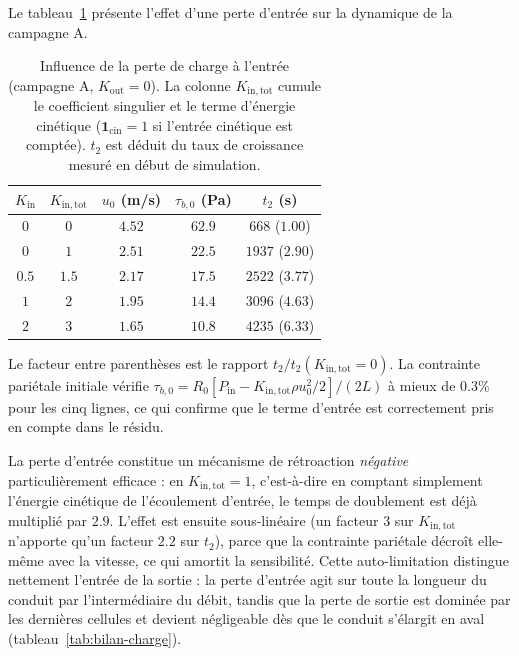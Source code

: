 \documentclass[11pt,a4paper]{report}
\newcommand{\kout}{K_{\mathrm{out}}}
\begin{document}
Le tableau~\ref{tab:kin} présente l'effet d'une perte d'entrée sur la dynamique de la campagne A.

\begin{table}[H]
\centering
\caption{Influence de la perte de charge à l'entrée (campagne A, \(\kout = 0\)). La colonne
\(K_{\mathrm{in,tot}}\) cumule le coefficient singulier et le terme d'énergie cinétique
(\(\mathbf{1}_{\mathrm{cin}} = 1\) si l'entrée cinétique est comptée). \(t_2\) est déduit du taux de
croissance mesuré en début de simulation.}
\label{tab:kin}
\small
\begin{tabular}{ccccc}
\toprule
\(K_{\mathrm{in}}\) & \(K_{\mathrm{in,tot}}\) & \(u_0\) (m/s) & \(\tau_{b,0}\) (Pa) & \(t_2\) (s) \\
\midrule
\(0\)   & \(0\)   & \(4.52\) & \(62.9\)  & \(668\) \quad (\(1.00\)) \\
\(0\)   & \(1\)   & \(2.51\) & \(22.5\)  & \(1937\) \quad (\(2.90\)) \\
\(0.5\) & \(1.5\) & \(2.17\) & \(17.5\)  & \(2522\) \quad (\(3.77\)) \\
\(1\)   & \(2\)   & \(1.95\) & \(14.4\)  & \(3096\) \quad (\(4.63\)) \\
\(2\)   & \(3\)   & \(1.65\) & \(10.8\)  & \(4235\) \quad (\(6.33\)) \\
\bottomrule
\end{tabular}
\begin{tablenotes}
\small
\item Le facteur entre parenthèses est le rapport \(t_2/t_2(K_{\mathrm{in,tot}} = 0)\). La contrainte
pariétale initiale vérifie \(\tau_{b,0} = R_0\left[P_{\mathrm{in}} -
K_{\mathrm{in,tot}}\rho u_0^2/2\right]/(2L)\) à mieux de \(0.3\%\) pour les cinq lignes, ce qui confirme
que le terme d'entrée est correctement pris en compte dans le résidu.
\end{tablenotes}
\end{table}

La perte d'entrée constitue un mécanisme de rétroaction \emph{négative} particulièrement efficace : en
\(K_{\mathrm{in,tot}} = 1\), c'est-à-dire en comptant simplement l'énergie cinétique de l'écoulement
d'entrée, le temps de doublement est déjà multiplié par \(2.9\). L'effet est ensuite sous-linéaire (un
facteur \(3\) sur \(K_{\mathrm{in,tot}}\) n'apporte qu'un facteur \(2.2\) sur \(t_2\)), parce que la
contrainte pariétale décroît elle-même avec la vitesse, ce qui amortit la sensibilité. Cette
auto-limitation distingue nettement l'entrée de la sortie : la perte d'entrée agit sur toute la longueur du
conduit par l'intermédiaire du débit, tandis que la perte de sortie est dominée par les dernières cellules
et devient négligeable dès que le conduit s'élargit en aval (tableau~\ref{tab:bilan-charge}).
\end{document}
